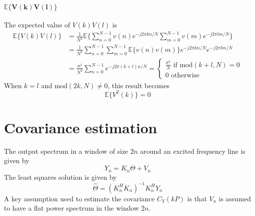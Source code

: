 \paragraph{$\boldsymbol{\mathbb{E}\{V(k)V(l)\}}$}
The expected value of $V(k)V(l)$ is
\begin{align*}
    \mathbb{E}\{V(k)V(l)\} &= \frac{1}{N^2} \mathbb{E}\{\sum_{n=0}^{N-1} v(n) e^{-j 2\pi k n/N} \sum_{m=0}^{N-1} v(m) e^{-j 2\pi l m/N}\}\\
    &= \frac{1}{N^2} \sum_{n=0}^{N-1}\sum_{m=0}^{N-1} \mathbb{E}\{v(n)v(m)\}  e^{-j 2\pi k n/N} e^{-j 2\pi l m/N}\\
    &=\frac{\sigma^2}{N^2}\sum_{n=0}^{N-1}e^{-j 2\pi (k+l) n/N} =
    \begin{cases} 
        \frac{\sigma^2}{N} \text{ if } \text{mod}(k+l,N) = 0\\
        0 \text{ otherwise}
    \end{cases}
\end{align*}
When $k = l$ and $\text{mod}(2k,N) \neq 0$, this result becomes
\begin{equation*}
    \mathbb{E}\{V^2(k)\} = 0
\end{equation*}

\newpage
\section{Covariance estimation}
\label{appendix:cov_est}
The output spectrum in a window of size $2n$ around an excited frequency line is given by
\begin{equation*}
    Y_n = K_n \Theta + V_n
\end{equation*}
The least squares solution is given by
\begin{equation*}
    \hat{\Theta} = (K_n^H K_n)^{-1}K_n^H Y_n
\end{equation*}
A key assumption used to estimate the covariance $C_Y(kP)$ is that $V_n$ is assumed to have a flat power spectrum in the window $2n$.

